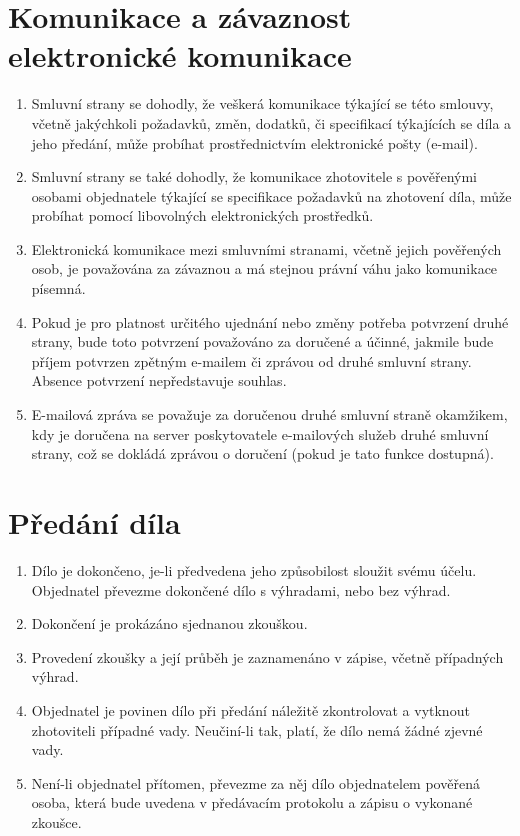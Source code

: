 \documentclass[]{article}
\begin{document}
\section{Komunikace a závaznost elektronické komunikace}
\label{clanek:komunikace}
\begin{enumerate}
	\item Smluvní strany se dohodly, že veškerá komunikace týkající se této smlouvy, včetně jakýchkoli požadavků, změn, dodatků, či specifikací týkajících se díla a jeho předání, může probíhat prostřednictvím elektronické pošty (e-mail).
	\item Smluvní strany se také dohodly, že komunikace zhotovitele s pověřenými osobami objednatele týkající se specifikace požadavků na zhotovení díla, může probíhat pomocí libovolných elektronických prostředků.
	\item Elektronická komunikace mezi smluvními stranami, včetně jejich pověřených osob, je považována za závaznou a má stejnou právní váhu jako komunikace písemná.
	\item Pokud je pro platnost určitého ujednání nebo změny potřeba potvrzení druhé strany, bude toto potvrzení považováno za doručené a účinné, jakmile bude příjem potvrzen zpětným e-mailem či zprávou od druhé smluvní strany. Absence potvrzení nepředstavuje souhlas.
	\item E-mailová zpráva se považuje za doručenou druhé smluvní straně okamžikem, kdy je doručena na server poskytovatele e-mailových služeb druhé smluvní strany, což se dokládá zprávou o doručení (pokud je tato funkce dostupná).
\end{enumerate}

\section{Předání díla}
\begin{enumerate}
	\item Dílo je dokončeno, je-li předvedena jeho způsobilost sloužit svému účelu. Objednatel převezme dokončené dílo s výhradami, nebo bez výhrad.
	\item Dokončení je prokázáno sjednanou zkouškou.
	\item Provedení zkoušky a její průběh je zaznamenáno v zápise, včetně případných výhrad.
	\item Objednatel je povinen dílo při předání náležitě zkontrolovat a vytknout zhotoviteli případné vady. Neučiní-li tak, platí, že dílo nemá žádné zjevné vady.
	\item Není-li objednatel přítomen, převezme za něj dílo objednatelem pověřená osoba, která bude uvedena v předávacím protokolu a zápisu o vykonané zkoušce.
\end{enumerate}
\end{document}
